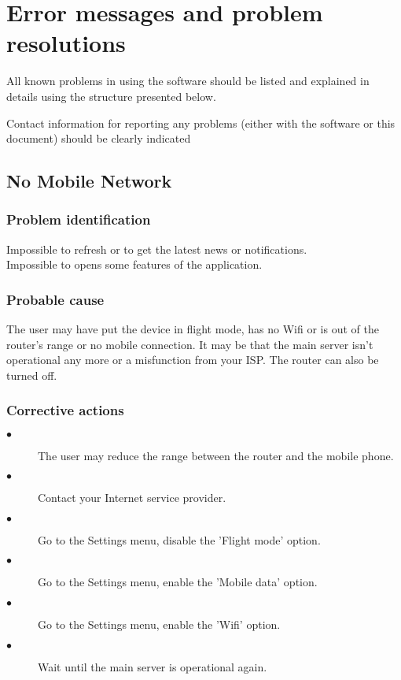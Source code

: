 
\chapter{Error messages and problem resolutions}
\label{chap:error_messages}

All known problems in using the software should be listed and explained in
details using the structure presented below.

Contact information for reporting any problems (either with the software or
this document) should be clearly indicated


\section{No Mobile Network}

\subsection{Problem identification}
Impossible to refresh or to get the latest news or notifications.\\
Impossible to opens some features of the application.

\subsection{Probable cause}
The user may have put the device in flight mode, has no Wifi or is out of the
router's range or no mobile connection. It may be that the main server isn't
operational any more or a misfunction from your ISP. The router can also be
turned off.

\subsection{Corrective actions}
\begin{description} 
\item[$\bullet$] The user may reduce the range between the router and the mobile
phone.
\item[$\bullet$] Contact your Internet service provider.
\item[$\bullet$] Go to the Settings menu, disable the 'Flight mode' option.
\item[$\bullet$] Go to the Settings menu, enable the 'Mobile data' option.
\item[$\bullet$] Go to the Settings menu, enable the 'Wifi' option.
\item[$\bullet$] Wait until the main server is operational again.
\end{description} 

